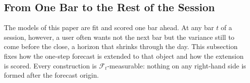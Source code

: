 \ifdefined\mhNDays\else\fi

\subsection{From One Bar to the Rest of the Session}
\label{sec:multihorizon_methods}


The models of this paper are fit and scored one bar ahead. At any bar
$t$ of a session, however, a user often wants not the next bar but the
variance still to come before the close, a horizon that shrinks
through the day. This subsection fixes how the one-step forecast is
extended to that object and how the extension is scored. Every
construction is $\mathcal{F}_t$-measurable: nothing on any right-hand
side is formed after the forecast origin.

\iffalse
